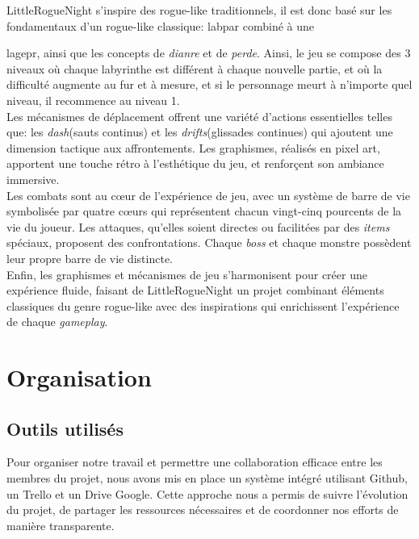 \documentclass[10pt]{article}
\begin{document}
LittleRogueNight s'inspire des rogue-like traditionnels, il est donc basé sur les fondamentaux d'un rogue-like classique: \gls{labpar} combiné à une

\gls{lagepr}, ainsi que les concepts de \textit{\gls{dianre}} et de \textit{\gls{perde}}. 
Ainsi, le jeu se compose des 3 niveaux où chaque labyrinthe est différent à chaque nouvelle partie, et où la difficulté augmente au fur et à mesure, et si le personnage meurt à n'importe quel niveau, il recommence au niveau 1.\\

Les mécanismes de déplacement offrent une variété d'actions essentielles telles que: les \textit{\gls{dash}}(sauts continus) et les \textit{\gls{drifts}}(glissades continues) qui ajoutent une dimension tactique aux affrontements. Les graphismes, réalisés en pixel art, apportent une touche rétro à l'esthétique du jeu, et renforçent son ambiance immersive.\\

Les combats sont au cœur de l'expérience de jeu, avec un système de barre de vie symbolisée par quatre cœurs qui représentent chacun vingt-cinq pourcents
de la vie du joueur. Les attaques, qu'elles soient directes ou facilitées par des \textit{\gls{items}} spéciaux, proposent des confrontations. Chaque \textit{\gls{boss}} et chaque monstre possèdent leur propre barre de vie distincte.\\

Enfin, les graphismes et mécanismes de jeu s'harmonisent pour créer une expérience fluide, faisant de LittleRogueNight un projet 
combinant éléments classiques du genre rogue-like avec des inspirations qui enrichissent l'expérience de chaque \textit{\gls{gameplay}}.

\clearpage
\section{Organisation}   
\subsection{Outils utilisés}
Pour organiser notre travail et permettre une collaboration efficace entre les membres du projet, nous avons mis en place un système intégré utilisant \gls{Github}, un \gls{Trello} et un Drive Google. Cette approche nous a permis de suivre l'évolution du projet, de partager les ressources nécessaires et de coordonner nos efforts de manière transparente.
\end{document}
